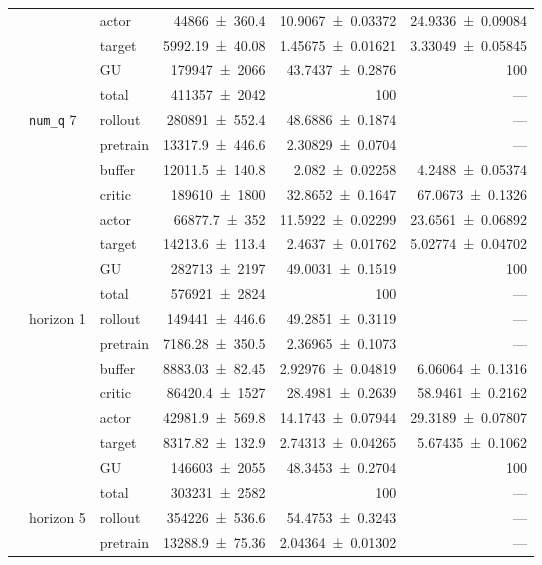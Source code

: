 {\begin{longtable}{@{}lllrrr@{}}
     &  & actor & \num{44866+-360.4} & \num{10.9067+-0.03372} & \num{24.9336+-0.09084} \\
     &  & target & \num{5992.19+-40.08} & \num{1.45675+-0.01621} & \num{3.33049+-0.05845} \\
     &  & GU & \num{179947+-2066} & \num{43.7437+-0.2876} & 100 \\
     &  & total & \num{411357+-2042} & \num{100} & --- \\
    \addlinespace[2pt]
     & \texttt{num\_q} 7 & rollout & \num{280891+-552.4} & \num{48.6886+-0.1874} & --- \\
     &  & pretrain & \num{13317.9+-446.6} & \num{2.30829+-0.0704} & --- \\
     &  & buffer & \num{12011.5+-140.8} & \num{2.082+-0.02258} & \num{4.2488+-0.05374} \\
     &  & critic & \num{189610+-1800} & \num{32.8652+-0.1647} & \num{67.0673+-0.1326} \\
     &  & actor & \num{66877.7+-352} & \num{11.5922+-0.02299} & \num{23.6561+-0.06892} \\
     &  & target & \num{14213.6+-113.4} & \num{2.4637+-0.01762} & \num{5.02774+-0.04702} \\
     &  & GU & \num{282713+-2197} & \num{49.0031+-0.1519} & 100 \\
     &  & total & \num{576921+-2824} & \num{100} & --- \\
    \addlinespace[2pt]
     & horizon 1 & rollout & \num{149441+-446.6} & \num{49.2851+-0.3119} & --- \\
     &  & pretrain & \num{7186.28+-350.5} & \num{2.36965+-0.1073} & --- \\
     &  & buffer & \num{8883.03+-82.45} & \num{2.92976+-0.04819} & \num{6.06064+-0.1316} \\
     &  & critic & \num{86420.4+-1527} & \num{28.4981+-0.2639} & \num{58.9461+-0.2162} \\
     &  & actor & \num{42981.9+-569.8} & \num{14.1743+-0.07944} & \num{29.3189+-0.07807} \\
     &  & target & \num{8317.82+-132.9} & \num{2.74313+-0.04265} & \num{5.67435+-0.1062} \\
     &  & GU & \num{146603+-2055} & \num{48.3453+-0.2704} & 100 \\
     &  & total & \num{303231+-2582} & \num{100} & --- \\
    \addlinespace[2pt]
     & horizon 5 & rollout & \num{354226+-536.6} & \num{54.4753+-0.3243} & --- \\
     &  & pretrain & \num{13288.9+-75.36} & \num{2.04364+-0.01302} & --- \\

\end{longtable}}
